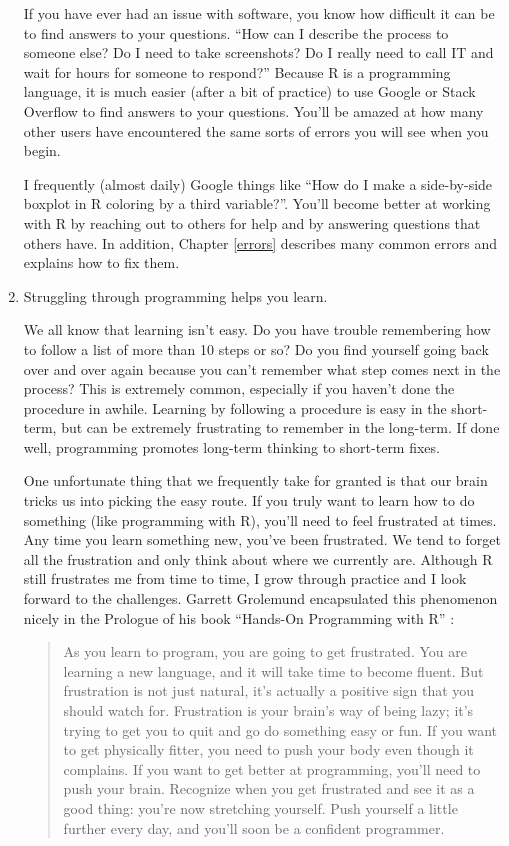 \documentclass[]{tufte-book}
\begin{document}
\begin{enumerate}
  If you have ever had an issue with software, you know how difficult it can be to find answers to your questions. ``How can I describe the process to someone else? Do I need to take screenshots? Do I really need to call IT and wait for hours for someone to respond?'' Because R is a programming language, it is much easier (after a bit of practice) to use Google or Stack Overflow to find answers to your questions. You'll be amazed at how many other users have encountered the same sorts of errors you will see when you begin.

  I frequently (almost daily) Google things like ``How do I make a side-by-side boxplot in R coloring by a third variable?''. You'll become better at working with R by reaching out to others for help and by answering questions that others have. In addition, Chapter \ref{errors} describes many common errors and explains how to fix them.
\item
  Struggling through programming helps you learn.

  We all know that learning isn't easy. Do you have trouble remembering how to follow a list of more than 10 steps or so? Do you find yourself going back over and over again because you can't remember what step comes next in the process? This is extremely common, especially if you haven't done the procedure in awhile. Learning by following a procedure is easy in the short-term, but can be extremely frustrating to remember in the long-term. If done well, programming promotes long-term thinking to short-term fixes.

  One unfortunate thing that we frequently take for granted is that our brain tricks us into picking the easy route. If you truly want to learn how to do something (like programming with R), you'll need to feel frustrated at times. Any time you learn something new, you've been frustrated. We tend to forget all the frustration and only think about where we currently are. Although R still frustrates me from time to time, I grow through practice and I look forward to the challenges. Garrett Grolemund encapsulated this phenomenon nicely in the Prologue of his book ``Hands-On Programming with R'' \citep{handson2014}:

  \begin{quote}
  As you learn to program, you are going to get frustrated. You are learning a new language, and it will take time to become fluent. But frustration is not just natural, it's actually a positive sign that you should watch for. Frustration is your brain's way of being lazy; it's trying to get you to quit and go do something easy or fun. If you want to get physically fitter, you need to push your body even though it complains. If you want to get better at programming, you'll need to push your brain. Recognize when you get frustrated and see it as a good thing: you're now stretching yourself. Push yourself a little further every day, and you'll soon be a confident programmer.
  \end{quote}
\end{enumerate}
\end{document}
